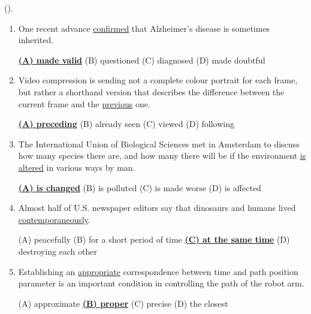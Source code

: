 \documentclass[main.tex]{subfiles}
\begin{document}
\setcounter{section}{100}


\setcounter{subsection}{1}

\hypertarget{ltask:2024-02-14}{} (\hyperref[task:2024-02-14]{\color{blue}{перейти к тексту задания без выбранного варианта ответа}}).
\vspace{3mm}

\begin{enumerate}[nosep,leftmargin=*]
	\itemsep10pt
	\item One recent advance \uline{confirmed} that Alzheimer's disease is sometimes inherited.
	
	\uline{\textbf{(A) made valid}} \quad (B) questioned \quad (C) diagnosed \quad (D) made doubtful
	\item Video compression is sending not a complete colour portrait for each frame, but rather a shorthand version that describes the difference between the current frame and the \uline{previous} one.
	
	\uline{\textbf{(A) preceding}} \quad (B) already seen \quad (C) viewed \quad (D) following
	\item The International Union of Biological Sciences met in Amsterdam to discuss how many species there are, and how many there will be if the environment \uline{is altered} in various ways by man.
	
	\uline{\textbf{(A) is changed}} \quad (B) is polluted \quad (C) is made worse \quad (D) is affected
	\item Almost half of U.S. newspaper editors say that dinosaurs and humans lived \uline{contemporaneously}.
	
	(A) peacefully \quad (B) for a short period of time \quad \uline{\textbf{(C) at the same time}} \quad (D) destroying each other
	\item Establishing an \uline{appropriate} correspondence between time and path position parameter is an important condition in controlling the path of the robot arm.
	
	(A) approximate \quad \uline{\textbf{(B) proper}} \quad (C) precise \quad (D) the closest
\end{enumerate}

\setcounter{subsection}{2}
\end{document}
